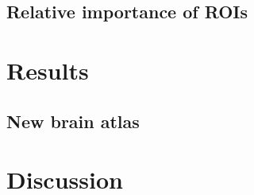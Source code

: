 \documentclass[10pt,letterpaper]{article}\usepackage[]{graphicx}\usepackage[]{color}
\begin{document}
\subsection{Relative importance of ROIs}

\section{Results}

\subsection{New brain atlas}

\section{Discussion}


\end{document}
